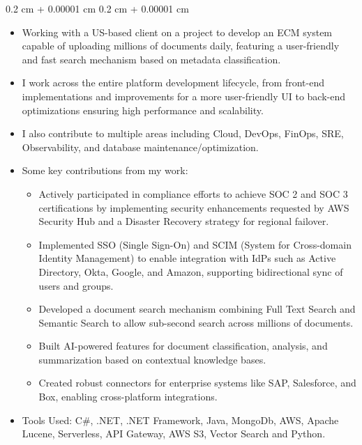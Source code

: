 \documentclass[10pt, letterpaper]{article}
\newenvironment{highlights}{
    \begin{itemize}[
        topsep=0.10 cm,
        parsep=0.10 cm,
        partopsep=0pt,
        itemsep=0pt,
        leftmargin=0.4 cm + 10pt
    ]
}{
    \end{itemize}
} %
\newenvironment{highlightsforbulletentries}{
    \begin{itemize}[
        topsep=0.10 cm,
        parsep=0.10 cm,
        partopsep=0pt,
        itemsep=0pt,
        leftmargin=10pt
    ]
}{
    \end{itemize}
} %
\newenvironment{onecolentry}{
    \begin{adjustwidth}{
        0.2 cm + 0.00001 cm
    }{
        0.2 cm + 0.00001 cm
    }
}{
    \end{adjustwidth}
} %
\begin{document}
        \vspace{0.10 cm}
        \begin{onecolentry}
            \begin{highlights}
                \item Working with a US-based client on a project to develop an ECM system capable of uploading millions of documents daily, featuring a user-friendly and fast search mechanism based on metadata classification.
                \item I work across the entire platform development lifecycle, from front-end implementations and improvements for a more user-friendly UI to back-end optimizations ensuring high performance and scalability.
                \item I also contribute to multiple areas including Cloud, DevOps, FinOps, SRE, Observability, and database maintenance/optimization.
                \item Some key contributions from my work:
                \begin{highlightsforbulletentries}
                    \item Actively participated in compliance efforts to achieve SOC 2 and SOC 3 certifications by implementing security enhancements requested by AWS Security Hub and a Disaster Recovery strategy for regional failover.
                    \item Implemented SSO (Single Sign-On) and SCIM (System for Cross-domain Identity Management) to enable integration with IdPs such as Active Directory, Okta, Google, and Amazon, supporting bidirectional sync of users and groups.
                    \item Developed a document search mechanism combining Full Text Search and Semantic Search to allow sub-second search across millions of documents.
                    \item Built AI-powered features for document classification, analysis, and summarization based on contextual knowledge bases.
                    \item Created robust connectors for enterprise systems like SAP, Salesforce, and Box, enabling cross-platform integrations.
                \end{highlightsforbulletentries}
                \item Tools Used: C\#, .NET, .NET Framework, Java, MongoDb, AWS, Apache Lucene, Serverless, API Gateway, AWS S3, Vector Search and Python.
            \end{highlights}
        \end{onecolentry}
\end{document}
